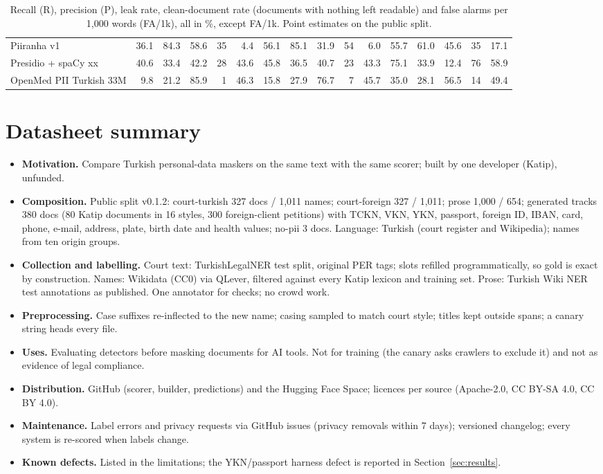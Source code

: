 \documentclass[10pt,twocolumn]{article}
\begin{document}
\begin{table}[h]
\begin{tabular}{@{}l rrrrr rrrrr rrrrr@{}}
Piiranha v1 & 36.1 & 84.3 & 58.6 & 35 & 4.4 & 56.1 & 85.1 & 31.9 & 54 & 6.0 & 55.7 & 61.0 & 45.6 & 35 & 17.1 \\
Presidio + spaCy xx & 40.6 & 33.4 & 42.2 & 28 & 43.6 & 45.8 & 36.5 & 40.7 & 23 & 43.3 & 75.1 & 33.9 & 12.4 & 76 & 58.9 \\
OpenMed PII Turkish 33M & 9.8 & 21.2 & 85.9 & 1 & 46.3 & 15.8 & 27.9 & 76.7 & 7 & 45.7 & 35.0 & 28.1 & 56.5 & 14 & 49.4 \\
\bottomrule
\end{tabular}
\caption{Recall (R), precision (P), leak rate, clean-document rate (documents with nothing left readable) and
false alarms per 1,000 words (FA/1k), all in \%, except FA/1k. Point estimates on the public split.}
\label{tab:tracks}
\end{table}

\section{Datasheet summary}
\label{app:datasheet}
\begin{itemize}
\item \textbf{Motivation.} Compare Turkish personal-data maskers on the same text with the same scorer; built by
one developer (Katip), unfunded.
\item \textbf{Composition.} Public split v0.1.2: court-turkish 327 docs / 1,011 names; court-foreign 327 / 1,011;
prose 1,000 / 654; generated tracks 380 docs (80 Katip documents in 16 styles, 300 foreign-client petitions) with
TCKN, VKN, YKN, passport, foreign ID, IBAN, card, phone, e-mail, address, plate, birth date and health values;
no-pii 3 docs. Language: Turkish (court register and Wikipedia); names from ten origin groups.
\item \textbf{Collection and labelling.} Court text: TurkishLegalNER test split, original PER tags; slots refilled
programmatically, so gold is exact by construction. Names: Wikidata (CC0) via QLever, filtered against every
Katip lexicon and training set. Prose: Turkish Wiki NER test annotations as published. One annotator for checks;
no crowd work.
\item \textbf{Preprocessing.} Case suffixes re-inflected to the new name; casing sampled to match court style;
titles kept outside spans; a canary string heads every file.
\item \textbf{Uses.} Evaluating detectors before masking documents for AI tools. Not for training (the canary
asks crawlers to exclude it) and not as evidence of legal compliance.
\item \textbf{Distribution.} GitHub (scorer, builder, predictions) and the Hugging Face Space; licences per source
(Apache-2.0, CC BY-SA 4.0, CC BY 4.0).
\item \textbf{Maintenance.} Label errors and privacy requests via GitHub issues (privacy removals within 7 days);
versioned changelog; every system is re-scored when labels change.
\item \textbf{Known defects.} Listed in the limitations; the YKN/passport harness defect is reported in
Section~\ref{sec:results}.
\end{itemize}
\end{document}
